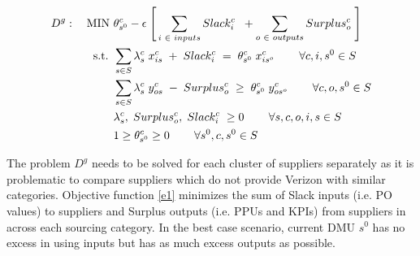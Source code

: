 \documentclass[inte,nonblindrev]{informs3} %
\begin{document}
\begin{APPENDICES}
\begin{align} 
D^{g}: \quad \text{MIN } & \theta_{s^0}^{c} - \epsilon \hspace{1 mm} \Bigg[\sum_{i \hspace{1 mm}\in \hspace{1 mm} inputs} Slack_{i}^{c} \hspace{2 mm} + \sum_{o \hspace{1 mm} \in \hspace{1 mm} outputs} Surplus_{o}^{c} \hspace{1 mm} \Bigg ] \label{e1} \\ 
\text{s.t. } & \sum_{s \in S} \lambda_{s}^c \hspace{1 mm} x_{is}^c \hspace{1 mm} + \hspace{1 mm}Slack_{i}^{c} \hspace{1 mm} = \hspace{1 mm} \theta_{s^0}^c \hspace{1 mm} x_{i{s}^o}^c \hspace{.3in} \forall c, i, s^0 \in S\label{e2}\\
& \sum_{s \in S} \lambda_{s}^c \hspace{1 mm} y_{os}^c \hspace{1 mm} - \hspace{1 mm}Surplus_{o}^{c} \hspace{1 mm} \geq \hspace{1 mm} \theta_{s^0}^c \hspace{1 mm} y_{o{s}^o}^c \hspace{.3in} \forall c, o, s^0 \in S \label{e3}\\
& \lambda_{s}^{c}, \hspace{1 mm} Surplus_{o}^{c}, \hspace{1 mm} Slack_{i}^{c} \hspace{1 mm}  \geq 0 \hspace{.3in} \forall s, c, o, i , s \in S\label{e4}\\
& 1 \geq \theta_{s^0}^{c} \geq 0 \hspace{.3in} \forall s^0, c, s^0 \in S \label{e5}
\end{align}

The problem $D^{g}$ needs to be solved for each cluster of suppliers separately as it is problematic to compare suppliers which do not provide Verizon with similar categories. Objective function \eqref{e1} minimizes the sum of Slack inputs (i.e. PO values) to suppliers and Surplus outputs (i.e. PPUs and KPIs) from suppliers in across each sourcing category. In the best case scenario, current DMU $s^0$ has no excess in using inputs but has as much excess outputs as possible.  


\end{APPENDICES}
\end{document}
